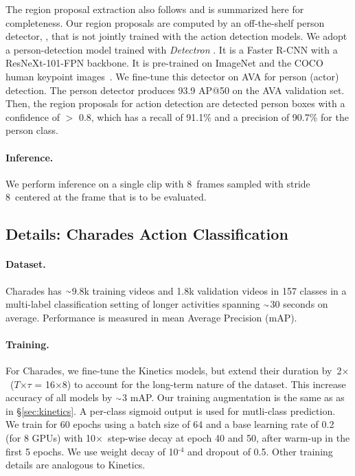 \documentclass[final]{cvpr}
\newcommand{\app}{\raise.17ex\hbox{$\scriptstyle\sim$}}
\def\x{$\times$}
\begin{document}
The region proposal extraction also follows \cite{Feichtenhofer19} and is summarized here for completeness. 
Our region proposals are computed by an off-the-shelf person detector, \ie, that is not jointly trained with the action detection models.
We adopt a person-detection model trained with \emph{Detectron} \cite{Detectron2018}. It is a Faster R-CNN with a ResNeXt-101-FPN backbone.
It is pre-trained on ImageNet and the COCO human keypoint images~\cite{Lin2014}.
We fine-tune this detector on AVA for person (actor) detection.
The person detector produces 93.9 AP@50 on the AVA validation set.
Then, the region proposals for action detection are detected person boxes with a confidence of $>$ 0.8, which has a recall of 91.1\% and a precision of 90.7\% for the person class.

\paragraph{Inference.} We perform inference on a single clip with 8~frames sampled with stride 8~centered at the frame that is to be evaluated.

\subsection{Details: Charades Action Classification}\label{sec:charades}
\paragraph{Dataset.}
Charades \cite{Sigurdsson2016} has $\app$9.8k training videos and 1.8k validation videos in 157 classes in a multi-label classification setting of longer activities spanning $\app$30 seconds on average. Performance is measured in mean Average Precision (mAP).

\paragraph{Training.}
For {Charades}, we fine-tune the Kinetics models, but extend their duration by~2\x~($T$\x $\tau$ = 16\x 8) to account for the long-term nature of the dataset. This increase accuracy of all models by $\app$3 mAP. 
Our training augmentation is the same as as in \S\ref{sec:kinetics}. 
A per-class sigmoid output is used for mutli-class prediction. We train for 60 epochs using a batch size of 64 and a base learning rate of 0.2 (for 8 GPUs) with 10\x~step-wise decay at epoch 40 and 50, after warm-up in the first 5 epochs. We use weight decay of 10$^\text{-4}$ and dropout of 0.5.  Other training details are analogous to Kinetics.
\end{document}
